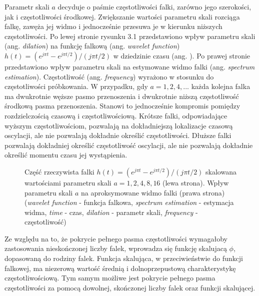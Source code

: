 \documentclass[notitlepage]{report}
\begin{document}
Parametr skali $a$ decyduje o paśmie częstotliwości falki, zarówno jego szerokości, jak i częstotliwości środkowej. Zwiększanie wartości parametru skali rozciąga falkę, zawęża jej widmo i jednocześnie przesuwa je w kierunku niższych częstotliwości. Po lewej stronie rysunku 3.1 przedstawiono wpływ parametru skali (ang. \textit{dilation}) na funkcję falkową (ang. \textit{wavelet function}) $h(t) = (e^{j\pi t} - e^{j\pi t/2})/(j\pi t/2)$ w dziedzinie czasu (ang. ). Po prawej stronie przedstawiono wpływ parametru skali na estymowane widmo falki (ang. \textit{spectrum estimation}). Częstotliwość (ang. \textit{frequency}) wyrażono w stosunku do częstotliwości próbkowania. W przypadku, gdy $a = 1,2,4,...$ każda kolejna falka ma dwukrotnie węższe pasmo przenoszenia i dwukrotnie niższą częstotliwość środkową pasma przenoszenia. Stanowi to jednocześnie kompromis pomiędzy rozdzielczością czasową i częstotliwościową. Krótsze falki, odpowiadające wyższym częstotliwościom, pozwalają na dokładniejszą lokalizacje czasową oscylacji, ale nie pozwalają dokładnie określić częstotliwości. Dłuższe falki pozwalają dokładniej określić częstotliwość oscylacji, ale nie pozwalają dokładnie określić momentu czasu jej wystąpienia. 
\begin{figure}[H]
	\centering
	\caption{Część rzeczywista falki $h(t) = (e^{j\pi t} - e^{j\pi t/2})/(j\pi t/2)$ skalowana wartościami parametru skali $a=1,2,4,8,16$ (lewa strona). Wpływ parametru skali $a$ na aproksymowane widmo falki (prawa strona) (\textit{wavelet function} - funkcja falkowa, \textit{spectrum estimation} - estymacja widma, \textit{time} - czas, \textit{dilation} - parametr skali, \textit{frequency} - częstotliwość) \cite{prochazka}}
\end{figure}
Ze względu na to, że pokrycie pełnego pasma częstotliwości wymagałoby zastosowania nieskończonej liczby falek, wprowadza się funkcję skalujacą $\phi$, dopasowaną do rodziny falek. Funkcja skalująca, w przeciwieństwie do funkcji falkowej, ma niezerową wartość średnią i dolnoprzepustową charakterystykę częstotliwościową. Tym samym możliwe jest pokrycie pełnego pasma częstotliwości za pomocą dowolnej, skończonej liczby falek oraz funkcji skalującej.
\end{document}
